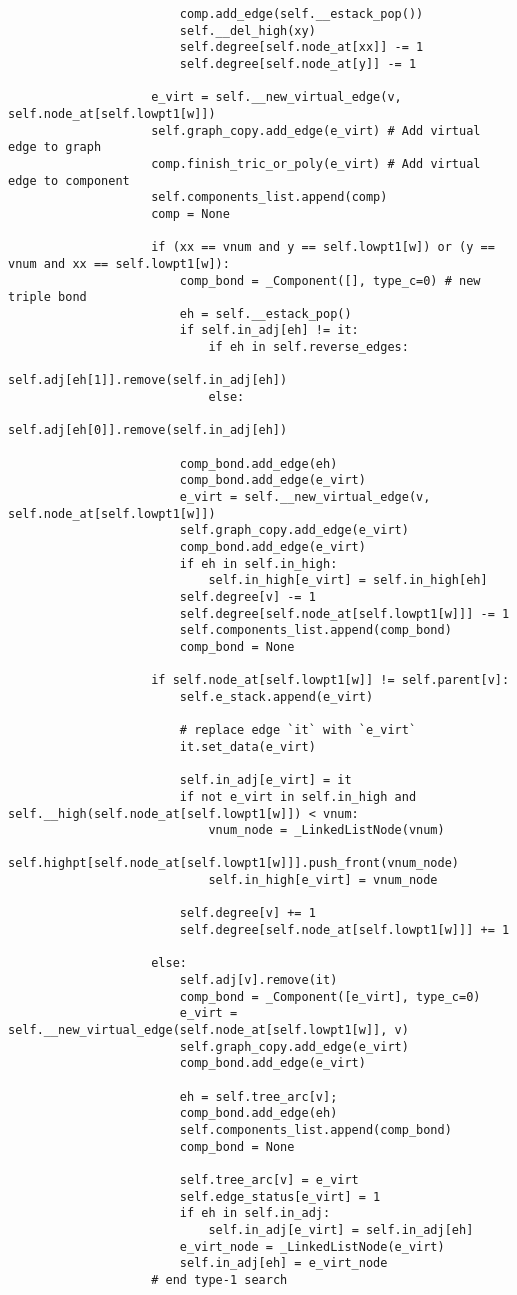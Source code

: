 \begin{verbatim}
						comp.add_edge(self.__estack_pop())
						self.__del_high(xy)
						self.degree[self.node_at[xx]] -= 1
						self.degree[self.node_at[y]] -= 1

					e_virt = self.__new_virtual_edge(v, self.node_at[self.lowpt1[w]])
					self.graph_copy.add_edge(e_virt) # Add virtual edge to graph
					comp.finish_tric_or_poly(e_virt) # Add virtual edge to component
					self.components_list.append(comp)
					comp = None

					if (xx == vnum and y == self.lowpt1[w]) or (y == vnum and xx == self.lowpt1[w]):
						comp_bond = _Component([], type_c=0) # new triple bond
						eh = self.__estack_pop()
						if self.in_adj[eh] != it:
							if eh in self.reverse_edges:
								self.adj[eh[1]].remove(self.in_adj[eh])
							else:
								self.adj[eh[0]].remove(self.in_adj[eh])

						comp_bond.add_edge(eh)
						comp_bond.add_edge(e_virt)
						e_virt = self.__new_virtual_edge(v, self.node_at[self.lowpt1[w]])
						self.graph_copy.add_edge(e_virt)
						comp_bond.add_edge(e_virt)
						if eh in self.in_high:
							self.in_high[e_virt] = self.in_high[eh]
						self.degree[v] -= 1
						self.degree[self.node_at[self.lowpt1[w]]] -= 1
						self.components_list.append(comp_bond)
						comp_bond = None

					if self.node_at[self.lowpt1[w]] != self.parent[v]:
						self.e_stack.append(e_virt)

						# replace edge `it` with `e_virt`
						it.set_data(e_virt)

						self.in_adj[e_virt] = it
						if not e_virt in self.in_high and self.__high(self.node_at[self.lowpt1[w]]) < vnum:
							vnum_node = _LinkedListNode(vnum)
							self.highpt[self.node_at[self.lowpt1[w]]].push_front(vnum_node)
							self.in_high[e_virt] = vnum_node

						self.degree[v] += 1
						self.degree[self.node_at[self.lowpt1[w]]] += 1

					else:
						self.adj[v].remove(it)
						comp_bond = _Component([e_virt], type_c=0)
						e_virt = self.__new_virtual_edge(self.node_at[self.lowpt1[w]], v)
						self.graph_copy.add_edge(e_virt)
						comp_bond.add_edge(e_virt)

						eh = self.tree_arc[v];
						comp_bond.add_edge(eh)
						self.components_list.append(comp_bond)
						comp_bond = None

						self.tree_arc[v] = e_virt
						self.edge_status[e_virt] = 1
						if eh in self.in_adj:
							self.in_adj[e_virt] = self.in_adj[eh]
						e_virt_node = _LinkedListNode(e_virt)
						self.in_adj[eh] = e_virt_node
					# end type-1 search


\end{verbatim}
